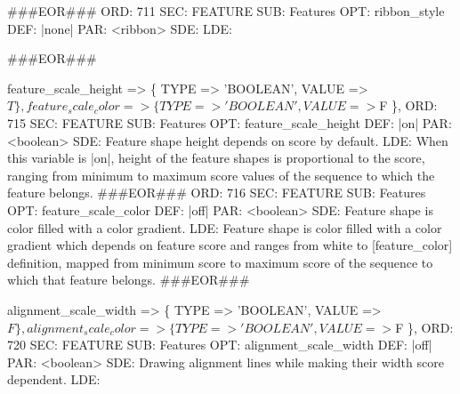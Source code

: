 \documentclass[11pt]{article}
\def\nwendcode{\endtrivlist \endgroup} %
\let\nwdocspar=\par                    %
\begin{document}
###EOR###
ORD: 711
SEC: FEATURE
SUB: Features
OPT: ribbon_style
DEF: |none|
PAR: <ribbon>
SDE: 
LDE: 

###EOR###
\nwendcode{}\nwdocspar

\nwenddocs{}\plusendmoddef
feature_scale_height       => \{ TYPE => 'BOOLEAN', VALUE => $T \},
feature_scale_color        => \{ TYPE => 'BOOLEAN', VALUE => $F \},
\eatline
{}\nwendcode{}\plusendmoddef
ORD: 715
SEC: FEATURE
SUB: Features
OPT: feature_scale_height
DEF: |on|
PAR: <boolean>
SDE: Feature shape height depends on score by default.
LDE: 
When this variable is |on|, height of the feature shapes is proportional to 
the score, ranging from minimum to maximum score values of the sequence to 
which the feature belongs.
###EOR###
ORD: 716
SEC: FEATURE
SUB: Features
OPT: feature_scale_color
DEF: |off|
PAR: <boolean>
SDE: Feature shape is color filled with a color gradient.
LDE:  
Feature shape is color filled with a color gradient which depends on feature
score and ranges from white to [feature_color] definition, mapped from minimum
score to maximum score of the sequence to which that feature belongs.
###EOR###
\nwendcode{}\nwdocspar

\nwenddocs{}\plusendmoddef
alignment_scale_width        => \{ TYPE => 'BOOLEAN', VALUE => $F \},
alignment_scale_color        => \{ TYPE => 'BOOLEAN', VALUE => $F \},
\eatline
{}\nwendcode{}\plusendmoddef
ORD: 720
SEC: FEATURE
SUB: Features
OPT: alignment_scale_width
DEF: |off|
PAR: <boolean>
SDE: Drawing alignment lines while making their width score dependent.
LDE: 
\end{document}

